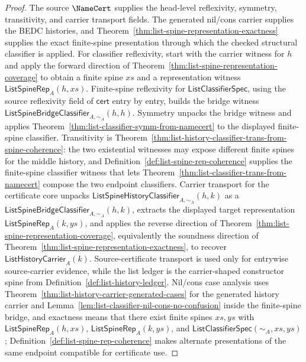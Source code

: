 \begin{proof}
The source $\NameCert$ supplies the head-level reflexivity, symmetry,
transitivity, and carrier transport fields. The generated nil/cons carrier
supplies the BEDC histories, and
Theorem~\ref{thm:list-spine-representation-exactness} supplies the exact
finite-spine presentation through which the checked structural classifier is
applied. For classifier reflexivity, start with the carrier witness for $h$ and apply the forward direction of Theorem~\ref{thm:list-spine-representation-coverage} to obtain a finite spine $xs$ and a representation witness $\mathsf{ListSpineRep}_A(h,xs)$. Finite-spine reflexivity for $\mathsf{ListClassifierSpec}$, using the source reflexivity field of $\mathsf{cert}$ entry by entry, builds the bridge witness $\mathsf{ListSpineBridgeClassifier}_{A,\sim_A}(h,h)$. Symmetry unpacks the bridge witness and applies
Theorem~\ref{thm:list-classifier-symm-from-namecert} to the displayed finite-spine classifier.
Transitivity is Theorem~\ref{thm:list-history-classifier-trans-from-spine-coherence}:
the two existential witnesses may expose different finite spines for the middle
history, and Definition~\ref{def:list-spine-rep-coherence} supplies the
finite-spine classifier witness that lets
Theorem~\ref{thm:list-classifier-trans-from-namecert} compose the two endpoint
classifiers. Carrier transport for the certificate core unpacks
$\mathsf{ListSpineHistoryClassifier}_{A,\sim_A}(h,k)$ as a $\mathsf{ListSpineBridgeClassifier}_{A,\sim_A}(h,k)$, extracts the displayed target representation $\mathsf{ListSpineRep}_A(k,ys)$, and applies the reverse direction of Theorem~\ref{thm:list-spine-representation-coverage}, equivalently the soundness direction of Theorem~\ref{thm:list-spine-representation-exactness}, to recover $\mathsf{ListHistoryCarrier}_A(k)$. Source-certificate transport is used only for entrywise source-carrier evidence, while the list ledger is the carrier-shaped constructor spine from Definition~\ref{def:list-history-ledger}. Nil/cons case analysis uses
Theorem~\ref{thm:list-history-carrier-generated-cases} for the generated history
carrier and Lemma~\ref{lem:list-classifier-nil-cons-no-confusion} inside the
finite-spine bridge, and exactness means that there exist finite spines $xs,ys$
with $\mathsf{ListSpineRep}_A(h,xs)$, $\mathsf{ListSpineRep}_A(k,ys)$, and
$\mathsf{ListClassifierSpec}(\sim_A,xs,ys)$; Definition~\ref{def:list-spine-rep-coherence}
makes alternate presentations of the same endpoint compatible for certificate use.
\end{proof}

